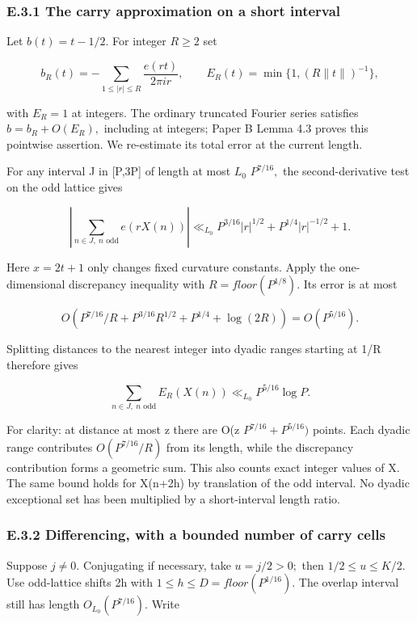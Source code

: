 \documentclass[11pt,a4paper]{article}
\begin{document}
\subsubsection{E.3.1 The carry approximation on a short
interval}\label{e.3.1-the-carry-approximation-on-a-short-interval}

Let \(b(t)={t}-1/2.\) For integer \(R\ge 2\) set

\[
 b_R(t)=-\sum_{1\le|r|\le R}\frac{e(rt)}{2\pi i r},\qquad
 E_R(t)=\min\{1,(R\|t\|)^{-1}\},
\]

with \(E_R=1\) at integers. The ordinary truncated Fourier series
satisfies \(b=b_R+O(E_R),\) including at integers; Paper B Lemma 4.3
proves this pointwise assertion. We re-estimate its total error at the
current length.

For any interval J in {[}P,3P{]} of length at most \(L_0\) \(P^{7/16},\)
the second-derivative test on the odd lattice gives

\[
 \left|\sum_{n\in J,\ n\text{ odd}} e(rX(n))\right|
 \ll_{L_0} P^{3/16}|r|^{1/2}+P^{1/4}|r|^{-1/2}+1.
 \tag{E.6}
\]

Here \(x=2t+1\) only changes fixed curvature constants. Apply the
one-dimensional discrepancy inequality with \(R=floor(P^{1/8}).\) Its
error is at most

\[
 O\left(P^{7/16}/R+P^{3/16}R^{1/2}+P^{1/4}+\log(2R)\right)
       =O(P^{5/16}).
\]

Splitting distances to the nearest integer into dyadic ranges starting
at 1/R therefore gives

\[
 \sum_{n\in J,\ n\text{ odd}} E_R(X(n))
          \ll_{L_0} P^{5/16}\log P.
 \tag{E.7}
\]

For clarity: at distance at most z there are O(z \(P^{7/16}+P^{5/16})\)
points. Each dyadic range contributes \(O(P^{7/16}/R)\) from its length,
while the discrepancy contribution forms a geometric sum. This also
counts exact integer values of X. The same bound holds for X(n+2h) by
translation of the odd interval. No dyadic exceptional set has been
multiplied by a short-interval length ratio.

\subsubsection{E.3.2 Differencing, with a bounded number of carry
cells}\label{e.3.2-differencing-with-a-bounded-number-of-carry-cells}

Suppose \(j\ne 0.\) Conjugating if necessary, take \(u=j/2>0;\) then
\(1/2\le u\le K/2.\) Use odd-lattice shifts 2h with
\(1\le h\le D=floor(P^{1/16}).\) The overlap interval still has length
\(O_{L_0}(P^{7/16}).\) Write
\end{document}
